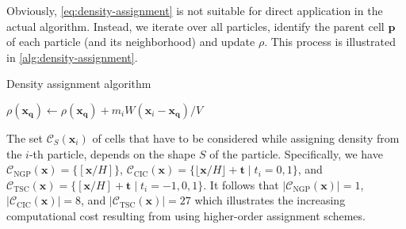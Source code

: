 Obviously, \autoref{eq:density-assignment} is not suitable for direct application in the actual algorithm.
Instead, we iterate over all particles, identify the parent cell $\mathbf{p}$ of each particle (and its neighborhood) and update $\rho$.
This process is illustrated in \autoref{alg:density-assignment}.
\begin{algorithm}
    \caption{Density assignment algorithm}\label{alg:density-assignment}
    \begin{algorithmic}
        \State $\rho(\mathbf{x}_\mathbf{q}) \gets \rho(\mathbf{x}_\mathbf{q}) + m_i W(\mathbf{x}_i - \mathbf{x}_\mathbf{q}) / V$
        \EndFor
        \EndFor
    \end{algorithmic}
\end{algorithm}
The set $\mathcal{C}_S(\mathbf{x}_i)$ of cells that have to be considered while assigning density from the $i$-th particle, depends on the shape $S$ of the particle.
Specifically, we have $\mathcal{C}_\mathrm{NGP}(\mathbf{x}) = \{[\mathbf{x} / H]\}$, $\mathcal{C}_\mathrm{CIC}(\mathbf{x}) = \{\lfloor \mathbf{x}/H \rfloor + \mathbf{t} \;|\; t_i =0,1\}$, and $\mathcal{C}_\mathrm{TSC}(\mathbf{x}) = \{[\mathbf{x} / H] + \mathbf{t} \;|\; t_i = -1, 0, 1\}$.
It follows that  $|\mathcal{C}_\mathrm{NGP}(\mathbf{x})| = 1$, $|\mathcal{C}_\mathrm{CIC}(\mathbf{x})| = 8$, and $|\mathcal{C}_\mathrm{TSC}(\mathbf{x})| = 27$ which illustrates the increasing computational cost resulting from using higher-order assignment schemes.

